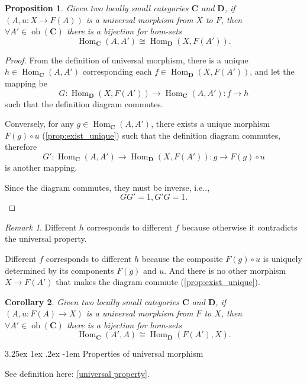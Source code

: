 \documentclass[12pt, letterpaper]{article}
\makeatletter
\renewcommand\subparagraph{\@startsection{subparagraph}{5}{\parindent}%
	{3.25ex \@plus1ex \@minus .2ex}%
	{0.75ex plus 0.1ex}%
	{\normalfont\normalsize\bfseries}}
\newcommand{\ob}{\operatorname{ob}}
\newcommand{\Hom}{\operatorname{Hom}}
\newcommand{\bfC}{\mathbf{C}}
\newcommand{\bfD}{\mathbf{D}}
\newcommand\ie{i.e\@ifnextchar.{}{.\@}}
\newtheorem{prop}{Proposition}[section]
\newtheorem{cor}[prop]{Corollary}
\renewcommand\subparagraph{\@startsection{subparagraph}{5}{\parindent}%
	{3.25ex \@plus1ex \@minus .2ex}%
	{-1em}%
	{\normalfont\normalsize\bfseries}}
\theoremstyle{definition}
\theoremstyle{remark}
\newtheorem*{rem*}{Remark}
\theoremstyle{definition}
\theoremstyle{plain}
\numberwithin{equation}{section}
\makeatother
\begin{document}
	\begin{prop}\label{prop:same_arrows}
		Given two locally small categories $\bfC$ and $\bfD$,
		if $(A,u\colon X\to F(A))$ is a universal morphism from $X$ to $F$,
		then $\forall A'\in \ob(\bfC)$ there is a bijection for hom-sets
		\[ \Hom_\bfC(A,A')\cong \Hom_\bfD(X,F(A')). \]
	\end{prop}
	\begin{proof}
		From the definition of universal morphism,
		there is a unique $h\in \Hom_\bfC(A,A')$ corresponding
		each $f\in \Hom_\bfD(X,F(A'))$, and let the mapping be
		\[ G\colon\Hom_\bfD(X,F(A'))\to  \Hom_\bfC(A,A')\colon f\to h  \]
		such that the definition diagram commutes.
		
		Conversely, for any $g\in \Hom_\bfC(A,A')$, there exists a unique
		morphism $ F(g) \circ u $ (\ref{prop:exist_unique}) such that the definition diagram commutes,
		therefore
		\[ G'\colon\Hom_\bfC(A,A')\to  \Hom_\bfD(X,F(A')) \colon g\to F(g) \circ u   \]
		is another mapping.
		
		Since the diagram commutes, they must be inverse, \ie,
		\[ GG'=1, G'G=1. \]
	\end{proof}
	\begin{rem*}
		Different $h$ corresponds to different $f$
		because otherwise it contradicts the universal property.
		
		Different $f$ corresponds to different $h$
		because the composite $F(g)\circ u$ is uniquely determined by its components $F(g)$ and $u$.
		And there is no other morphism $X\to F(A')$ that makes the diagram commute (\ref{prop:exist_unique}).
	\end{rem*}

	\begin{cor}\label{prop:same_arrows_from_F_to_X}
		Given two locally small categories $\bfC$ and $\bfD$,
		if $(A,u\colon F(A)\to X)$ is a universal morphism from $F$ to $X$,
		then $\forall A'\in \ob(\bfC)$ there is a bijection for hom-sets
		\[ \Hom_\bfC(A',A)\cong \Hom_\bfD(F(A'),X). \]
	\end{cor}

	\subparagraph{Properties of universal morphism}
	\label{par:universal_morph_prop}
	
	See definition here: \ref{universal property}.
	
\end{document}
